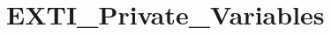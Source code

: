 \hypertarget{group___e_x_t_i___private___variables}{\section{E\-X\-T\-I\-\_\-\-Private\-\_\-\-Variables}
\label{group___e_x_t_i___private___variables}
}

